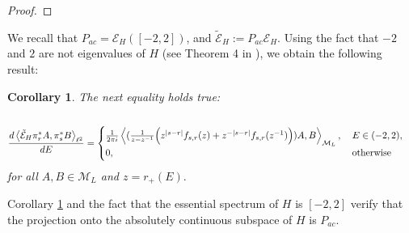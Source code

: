 \documentclass[12pt,oneside,onecolumn,open]{article}
\newtheorem{cor}[teo]{Corollary}
\begin{document}
\begin{proof}
\end{proof}


We recall that \( P_{ac} = \mathcal{E}_{H}([-2,2]) \), and \( \tilde{\mathcal{E}}_{H} := P_{ac} \mathcal{E}_{H} \).  
Using the fact that \(-2\) and \(2\) are not eigenvalues of \(H\) (see Theorem 4 in \cite{MR4760547}), we obtain the following result:

   \begin{cor}\label{caro} The next equality holds true:
    \begin{align}
    \label{eq:derivative}
    \\ &\notag \frac{d \left< \tilde{ \mathcal{E}}_{H}\pi _r^{*}A, \pi _s^{*}B\right>_{\ell ^{2}}}{dE} = \begin{cases}  \notag \frac{1}{2\pi i} \left<(  \frac{ 1 }{ z - z^{-1} }  \Big ( z^{|s-r|} f_{s, r}(z)  + z^{-|s-r|} f_{s, r}(z^{-1}) \Big ) )A, B\right>_{\mathcal{M}_L} , \:  & E \in (-2,2) , \\ 
    0 ,  & \text{otherwise}\end{cases}
    \end{align}
  for all $A,B\in \mathcal{M}_L$ and $ z = r_+(E) .$
\end{cor}


Corollary \ref{caro} and the fact that the essential spectrum of \( H \) is \([-2,2]\) verify that the projection onto the absolutely continuous subspace of \( H \) is \( P_{ac} \).

   
\end{document}
